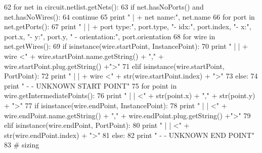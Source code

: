 \begin{DoxyCodeInclude}
{62       \textcolor{keywordflow}{for} net \textcolor{keywordflow}{in} circuit.netlist.getNets():
63           \textcolor{keywordflow}{if} net.hasNoPorts() \textcolor{keywordflow}{and} net.hasNoWires():
64               \textcolor{keywordflow}{continue}
65           \textcolor{keywordflow}{print} \textcolor{stringliteral}{" | + net name:"}, net.name
66           \textcolor{keywordflow}{for} port \textcolor{keywordflow}{in} net.getPorts():
67               \textcolor{keywordflow}{print} \textcolor{stringliteral}{" | | + port type:"}, port.type, \textcolor{stringliteral}{"- idx:"}, port.index, \textcolor{stringliteral}{"- x:"}, port.x, \textcolor{stringliteral}{"- y:"}, port.y, \textcolor{stringliteral}{"
      - orientation:"}, port.orientation
68           \textcolor{keywordflow}{for} wire \textcolor{keywordflow}{in} net.getWires():
69               \textcolor{keywordflow}{if} isinstance(wire.startPoint, InstancePoint):
70                   \textcolor{keywordflow}{print} \textcolor{stringliteral}{" | | + wire <"} + wire.startPoint.name.getString() + \textcolor{stringliteral}{","} + 
      wire.startPoint.plug.getString() +\textcolor{stringliteral}{">"}
71               \textcolor{keywordflow}{elif} isinstance(wire.startPoint, PortPoint):
72                   \textcolor{keywordflow}{print} \textcolor{stringliteral}{" | | + wire <"} + str(wire.startPoint.index) + \textcolor{stringliteral}{">"}
73               \textcolor{keywordflow}{else}:
74                   \textcolor{keywordflow}{print} \textcolor{stringliteral}{" - - UNKNOWN START POINT"}
75               \textcolor{keywordflow}{for} point \textcolor{keywordflow}{in} wire.getIntermediatePoints():
76                   \textcolor{keywordflow}{print} \textcolor{stringliteral}{" | |        <"} + str(point.x) + \textcolor{stringliteral}{","} + str(point.y) + \textcolor{stringliteral}{">"}
77               \textcolor{keywordflow}{if} isinstance(wire.endPoint, InstancePoint):
78                   \textcolor{keywordflow}{print} \textcolor{stringliteral}{" | |        <"} + wire.endPoint.name.getString() + \textcolor{stringliteral}{","} + 
      wire.endPoint.plug.getString() +\textcolor{stringliteral}{">"}
79               \textcolor{keywordflow}{elif} isinstance(wire.endPoint, PortPoint):
80                   \textcolor{keywordflow}{print} \textcolor{stringliteral}{" | |        <"} + str(wire.endPoint.index) + \textcolor{stringliteral}{">"}
81               \textcolor{keywordflow}{else}:
82                   \textcolor{keywordflow}{print} \textcolor{stringliteral}{" - - UNKNOWN END POINT"}
83   \textcolor{comment}{# sizing}
}
\end{DoxyCodeInclude}

